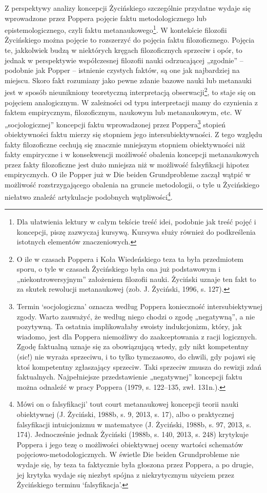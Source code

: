 \documentclass{article}
\begin{document}
Z perspektywy analizy koncepcji Życińskiego szczególnie przydatne wydaje się wprowadzone przez Poppera pojęcie faktu
metodologicznego lub epistemologicznego, czyli faktu metanaukowego\footnote{Dla ułatwienia lektury w całym tekście
treść idei, podobnie jak treść pojęć i koncepcji, piszę zazwyczaj kursywą. Kursywa służy również do podkreślenia
istotnych elementów znaczeniowych.}. W kontekście filozofii Życińskiego można pojęcie to rozszerzyć do pojęcia faktu
filozoficznego. Pojęcia te, jakkolwiek budzą w niektórych kręgach filozoficznych sprzeciw i opór, to jednak w
perspektywie współczesnej filozofii nauki odrzucającej „zgodnie” – podobnie jak Popper – istnienie czystych faktów, są
one jak najbardziej na miejscu. Skoro fakt rozumiany jako pewne zdanie bazowe nauki lub metanauki jest w sposób
nieunikniony teoretyczną interpretacją obserwacji\footnote{O ile w czasach Poppera i Koła Wiedeńskiego teza ta była
przedmiotem sporu, o tyle w czasach Życińskiego była ona już podstawowym i „niekontrowersyjnym” założeniem filozofii
nauki. Życiński uznaje ten fakt to za skutek rewolucji metanaukowej \label{ref:RNDNNdGM9DYkK}(zob. J. Życiński, 1996,
s. 127).}, to staje się on pojęciem analogicznym. W zależności od typu interpretacji mamy do czynienia z faktem
empirycznym, filozoficznym, naukowym lub metanaukowym, etc. W „socjologicznej” koncepcji faktu wprowadzonej przez
Poppera\footnote{Termin ‘socjologiczna’ oznacza według Poppera konieczność intersubiektywnej zgody. Warto zauważyć, że
według niego chodzi o zgodę „negatywną”, a nie pozytywną. Ta ostatnia implikowałaby swoisty indukcjonizm, który, jak
wiadomo, jest dla Poppera niemożliwy do zaakceptowania z racji logicznych. Zgodę faktualną uznaje się za obowiązującą
wtedy, gdy nikt kompetentny (sic!) nie wyraża sprzeciwu, i to tylko tymczasowo, do chwili, gdy pojawi się ktoś
kompetentny zgłaszający sprzeciw. Taki sprzeciw zmusza do rewizji zdań faktualnych. Najpełniejsze przedstawienie
„negatywnej” koncepcji faktu można odnaleźć w pracy Poppera \label{ref:RNDFSE3yxffmO}(1979, s. 122–135, zwł. 131n.).}
stopień obiektywności faktu mierzy się stopniem jego intersubiektywności. Z tego względu fakty filozoficzne cechują się
znacznie mniejszym stopniem obiektywności niż fakty empiryczne i w konsekwencji możliwość obalenia koncepcji
metanaukowych przez fakty filozoficzne jest dużo mniejsza niż w możliwość falsyfikacji hipotez empirycznych. O ile
Popper już w Die beiden Grundprobleme zaczął wątpić w możliwość rozstrzygającego obalenia na gruncie metodologii, o
tyle u Życińskiego niełatwo znaleźć artykulacje podobnych wątpliwości\footnote{Mówi on o falsyfikacji’ tout court
metanaukowej koncepcji teorii nauki obiektywnej \label{ref:RNDwQZn2Zd98X}(J. Życiński, 1988b, s. 9, 2013, s. 17), albo
o praktycznej falsyfikacji intuicjonizmu w matematyce \label{ref:RNDF7UBvcuK26}(J. Życiński, 1988b, s. 97, 2013, s.
174). Jednocześnie jednak Życiński \label{ref:RNDhVrobTs8jG}(1988b, s. 140, 2013, s. 248) krytykuje Poppera i jego tezę
o możliwości obiektywnej oceny wartości schematów pojęciowo-metodologicznych. W świetle Die beiden Grundprobleme nie
wydaje się, by teza ta faktycznie była głoszona przez Poppera, a po drugie, jej krytyka wydaje się niezbyt spójna z
niekrytycznym użyciem przez Życińskiego terminu ‘falsyfikacja’.}.
\end{document}
